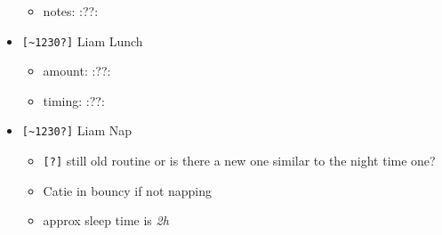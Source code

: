 \documentclass[letterpaper]{scrartcl}
\begin{document}
\begin{itemize}
  \begin{itemize}
  \itemsep1pt\parskip0pt
  \item
    notes: :??:
  \end{itemize}
\item
  \texttt{{[}\textasciitilde{}1230?{]}} Liam Lunch

  \begin{itemize}
  \itemsep1pt\parskip0pt
  \item
    amount: :??:
  \item
    timing: :??:
  \end{itemize}
\item
  \texttt{{[}\textasciitilde{}1230?{]}} Liam Nap

  \begin{itemize}
  \itemsep1pt\parskip0pt
  \item
    \texttt{{[}?{]}} still old routine or is there a new one similar to
    the night time one?
  \item
    Catie in bouncy if not napping
  \item
    approx sleep time is \emph{2h}
  \end{itemize}
\end{itemize}
\end{document}

